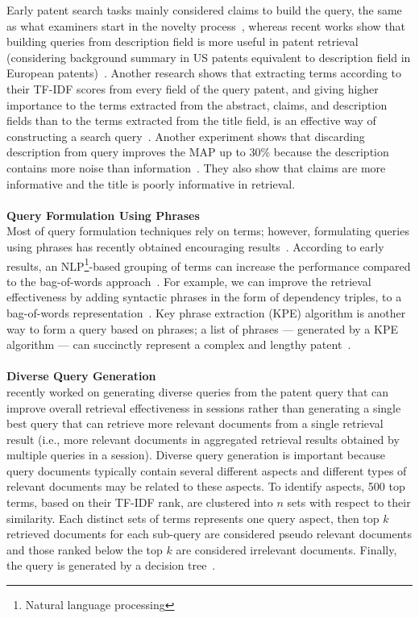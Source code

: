 Early patent search tasks mainly considered claims to build the query, the same as what examiners start in the novelty process~\citep{takaki2004associative, konishi2005query, mase2005proposal, fujii2007enhancing}, whereas recent works show that building queries from description field is more useful in patent retrieval (considering background summary in US patents equivalent to description field in European patents)~\citep{xue2009automatic, xue2009transforming, mahdabi2011building}. Another research shows that extracting terms according to their TF-IDF scores from every field of the query patent, and giving higher importance to the terms extracted from the abstract, claims, and description fields than to the terms extracted from the title field, is an effective way of constructing a search query~\citep{cetintas2012effective}. Another experiment shows that discarding description from query improves the MAP up to 30\% because the description contains more noise than information~\citep{gobeill2010simple}. They also show that claims are more informative and the title is poorly informative in retrieval.   
\\\\
\textbf{Query Formulation Using Phrases}
\ \\
Most of query formulation techniques rely on terms; however, formulating queries using phrases has recently obtained encouraging results~\citep{becks2010phrases}. According to early results, an NLP\footnote{Natural language processing}-based grouping of terms can increase the performance compared to the bag-of-words approach~\citep{osborn1997evaluating}. For example, we can improve the retrieval effectiveness by adding syntactic phrases in the form of dependency triples, to a bag-of-words representation~\citep{d2011combining}. Key phrase extraction (KPE) algorithm is another way to form a query based on phrases; a list of phrases --- generated by a KPE algorithm --- can succinctly represent a complex and lengthy patent~\citep{verma2011applying}.
\\\\
\textbf{Diverse Query Generation}
\ \\
\cite{kim2014diversifying} recently worked on generating diverse queries from the patent query that can improve overall retrieval effectiveness in sessions rather than generating a single best query that can retrieve more relevant documents from a single retrieval result (i.e., more relevant documents in aggregated retrieval results obtained by multiple queries in a session). Diverse query generation is important because query documents typically contain several different aspects and different types of relevant documents may be related to these aspects. To identify aspects, 500 top terms, based on their TF-IDF rank, are clustered into $ n $ sets with respect to their similarity. Each distinct sets of terms represents one query aspect, then top $ k $ retrieved documents for each sub-query are considered pseudo relevant documents and those ranked below the top $ k $ are considered irrelevant documents. Finally, the query is generated by a decision tree~\citep{kim2014searching, kim2014diversifying}.